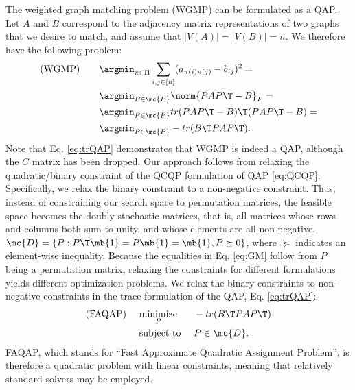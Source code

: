 \documentclass[10pt,journal,cspaper,compsoc]{IEEEtran}
\newcommand{\PmcP}{P \in \mc{P}}
\begin{document}
The weighted graph matching problem (WGMP) can be formulated as a QAP.  Let $A$ and $B$ correspond to the adjacency matrix representations of two graphs that we desire to match, and assume that $|V(A)|=|V(B)|=n$.  We therefore have the following problem:  
\begin{subequations} \label{eq:GM}
\begin{align}
\text{(WGMP)} \qquad 	&\argmin_{\pi \in \Pi} \sum_{i,j \in [n]} (a_{\pi(i) \pi(j)} - b_{ij})^2 =\\
	&\argmin_{\PmcP} \norm{PAP\T - B}_F = \\
	&\argmin_{\PmcP} tr(PAP\T - B)\T (PAP\T - B)  =\\
	&\argmin_{\PmcP} - tr(B\T PAP\T). \label{eq:trQAP} %
\end{align}
\end{subequations}
Note that Eq. \eqref{eq:trQAP} demonstrates that WGMP is indeed a QAP, although the $C$ matrix has been dropped. Our approach follows from relaxing the quadratic/binary constraint of the QCQP formulation of QAP \eqref{eq:QCQP}.  Specifically, we relax the binary constraint to a non-negative constraint.  Thus, instead of constraining our search space to permutation matrices, the feasible space becomes the doubly stochastic matrices, that is, all matrices whose rows and columns both sum to unity, and whose elements are all non-negative, $\mc{D}=\{P : P\T \mb{1} =  P \mb{1} = \mb{1}, P \succeq 0\}$, where $\succeq$ indicates an element-wise inequality. Because the equalities in Eq. \eqref{eq:GM} follow from $P$ being a permutation matrix, relaxing the constraints for different formulations yields different optimization problems.  We relax the binary constraints to non-negative constraints in the trace formulation of the QAP, Eq. \eqref{eq:trQAP}:
\begin{subequations} \label{eq:FAQAP}
\begin{align}
		\text{(FAQAP) } \quad &\underset{P}{\text{minimize}}  && - tr(B\T PAP\T) \label{eq:FAQAP1}  \\
		&\text{subject to } && P \in \mc{D}.
\end{align}
\end{subequations}
FAQAP, which stands for ``Fast Approximate Quadratic Assignment Problem'', is therefore a quadratic problem with linear constraints, meaning that relatively standard solvers may be employed.
\end{document}
